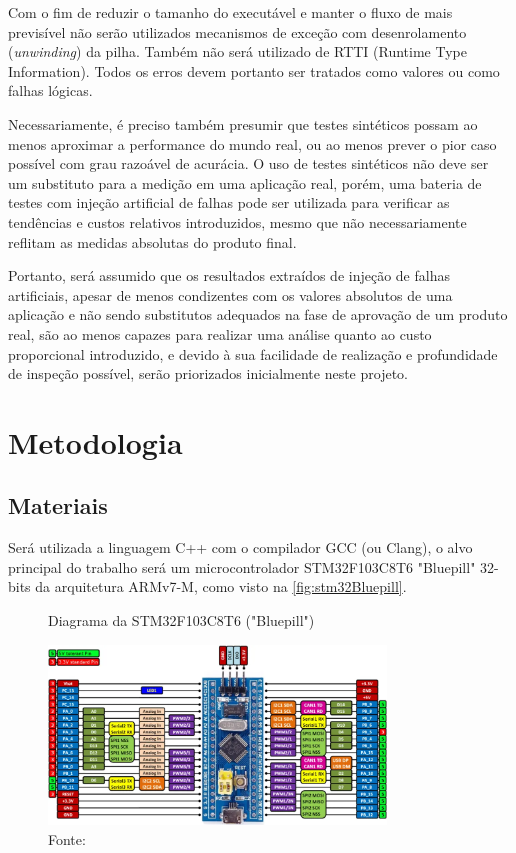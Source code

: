 Com o fim de reduzir o tamanho do executável e manter o fluxo de mais previsível não serão utilizados mecanismos de exceção com desenrolamento (\textit{unwinding}) da pilha. Também não será utilizado de RTTI (Runtime Type Information). Todos os erros devem portanto ser tratados como valores ou como falhas lógicas.

Necessariamente, é preciso também presumir que testes sintéticos possam ao menos aproximar a performance do mundo real, ou ao menos prever o pior caso possível com grau razoável de acurácia. O uso de testes sintéticos não deve ser um substituto para a medição em uma aplicação real, porém, uma bateria de testes com injeção artificial de falhas pode ser utilizada para verificar as tendências e custos relativos introduzidos, mesmo que não necessariamente reflitam as medidas absolutas do produto final.

Portanto, será assumido que os resultados extraídos de injeção de falhas artificiais, apesar de menos condizentes com os valores absolutos de uma aplicação e não sendo substitutos adequados na fase de aprovação de um produto real, são ao menos capazes para realizar uma análise quanto ao custo proporcional introduzido, e devido à sua facilidade de realização e profundidade de inspeção possível, serão priorizados inicialmente neste projeto.

\section{Metodologia}

\subsection{Materiais}


Será utilizada a linguagem C++ com o compilador GCC (ou Clang), o alvo principal do trabalho será um microcontrolador STM32F103C8T6 "Bluepill" 32-bits da arquitetura ARMv7-M, como visto na \autoref{fig:stm32Bluepill}.

\begin{figure}[H]
    \centering
    \captionsetup{justification=centering}
    \caption{Diagrama da STM32F103C8T6 ("Bluepill")}
    \includegraphics[width=0.80\textwidth]{assets/stm32_bluepill.png}
    \captionsetup{justification=raggedright}
    \caption*{Fonte: }
    \label{fig:stm32Bluepill}
\end{figure}

